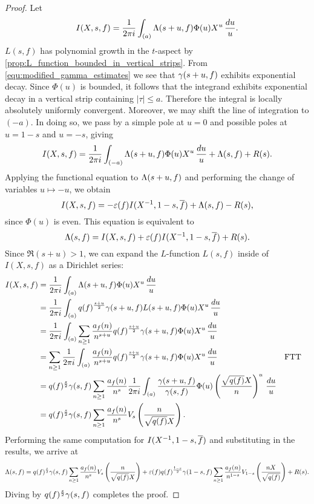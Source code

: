     \begin{proof}
      Let
      \[
        I(X,s,f) = \frac{1}{2\pi i}\int_{(a)}\Lambda(s+u,f)\Phi(u)X^{u}\,\frac{du}{u}.
      \]
      $L(s,f)$ has polynomial growth in the $t$-aspect by \cref{prop:L_function_bounded_in_vertical_strips}. From \cref{equ:modified_gamma_estimates} we see that $\gamma(s+u,f)$ exhibits exponential decay. Since $\Phi(u)$ is bounded, it follows that the integrand exhibits exponential decay in a vertical strip containing $|\tau| \le a$. Therefore the integral is locally absolutely uniformly convergent. Moreover, we may shift the line of integration to $(-a)$. In doing so, we pass by a simple pole at $u = 0$ and possible poles at $u = 1-s$ and $u = -s$, giving
      \[
        I(X,s,f) = \frac{1}{2\pi i}\int_{(-a)}\Lambda(s+u,f)\Phi(u)X^{u}\,\frac{du}{u}+\Lambda(s,f)+R(s).
      \]
      Applying the functional equation to $\Lambda(s+u,f)$ and performing the change of variables $u \mapsto -u$, we obtain
      \[
        I(X,s,f) = -\varepsilon(f)I(X^{-1},1-s,\overline{f})+\Lambda(s,f)-R(s),
      \]
      since $\Phi(u)$ is even. This equation is equivalent to
      \[
        \Lambda(s,f) = I(X,s,f)+\varepsilon(f)I(X^{-1},1-s,\overline{f})+R(s).
      \]
      Since $\Re(s+u) > 1$, we can expand the $L$-function $L(s,f)$ inside of $I(X,s,f)$ as a Dirichlet series:
      \begin{align*}
        I(X,s,f) &= \frac{1}{2\pi i}\int_{(a)}\Lambda(s+u,f)\Phi(u)X^{u}\,\frac{du}{u} \\
        &= \frac{1}{2\pi i}\int_{(a)}q(f)^{\frac{s+u}{2}}\gamma(s+u,f)L(s+u,f)\Phi(u)X^{u}\,\frac{du}{u} \\
        &= \frac{1}{2\pi i}\int_{(a)}\sum_{n \ge 1}\frac{a_{f}(n)}{n^{s+u}}q(f)^{\frac{s+u}{2}}\gamma(s+u,f)\Phi(u)X^{u}\,\frac{du}{u} \\
        &= \sum_{n \ge 1}\frac{1}{2\pi i}\int_{(a)}\frac{a_{f}(n)}{n^{s+u}}q(f)^{\frac{s+u}{2}}\gamma(s+u,f)\Phi(u)X^{u}\,\frac{du}{u} && \text{FTT} \\
        &= q(f)^{\frac{s}{2}}\gamma(s,f)\sum_{n \ge 1}\frac{a_{f}(n)}{n^{s}}\frac{1}{2\pi i}\int_{(a)}\frac{\gamma(s+u,f)}{\gamma(s,f)}\Phi(u)\left(\frac{\sqrt{q(f)}X}{n}\right)^{u}\,\frac{du}{u} \\
        &= q(f)^{\frac{s}{2}}\gamma(s,f)\sum_{n \ge 1}\frac{a_{f}(n)}{n^{s}}V_{s}\left(\frac{n}{\sqrt{q(f)}X}\right).
      \end{align*}
      Performing the same computation for $I(X^{-1},1-s,\overline{f})$ and substituting in the results, we arrive at
      \[
        \Lambda(s,f) = q(f)^{\frac{s}{2}}\gamma(s,f)\sum_{n \ge 1}\frac{a_{f}(n)}{n^{s}}V_{s}\left(\frac{n}{\sqrt{q(f)}X}\right)+\varepsilon(f)q(f)^{\frac{1-s}{2}}\gamma(1-s,f)\sum_{n \ge 1}\frac{a_{f}(n)}{n^{1-s}}V_{1-s}\left(\frac{nX}{\sqrt{q(f)}}\right)+R(s).
      \]
      Diving by $q(f)^{\frac{s}{2}}\gamma(s,f)$ completes the proof.
    \end{proof}

